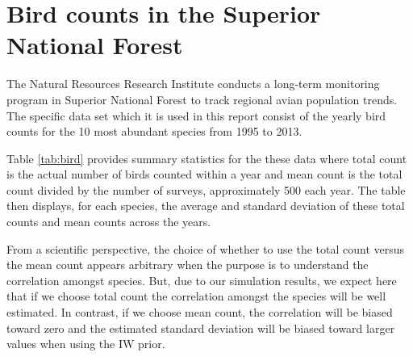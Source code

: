 \documentclass[12pt]{article}
\newcommand{\matt}[1]{\textcolor{red}{(matt: #1)}}
\begin{document}
\section{Bird counts in the Superior National Forest \label{sec:birds}}

The Natural Resources Research Institute conducts a long-term monitoring program in Superior National Forest to track regional avian population trends. The specific data set which it is used in this report consist of the yearly bird counts for the 10 most abundant species from 1995 to 2013. 

Table \ref{tab:bird} provides summary statistics for the these data where total count is the actual number of birds counted within a year and mean count is the total count divided by the number of surveys, approximately 500 each year. The table then displays, for each species, the average and standard deviation of these total counts and mean counts across the years.



From a scientific perspective, the choice of whether to use the total count versus the mean count appears arbitrary when the purpose is to understand the correlation amongst species. But, due to our simulation results, we expect here that if we choose total count the correlation amongst the species will be well estimated. In contrast, if we choose mean count, the correlation will be biased toward zero and the estimated standard deviation will be biased toward larger values when using the IW prior. 
\end{document}

